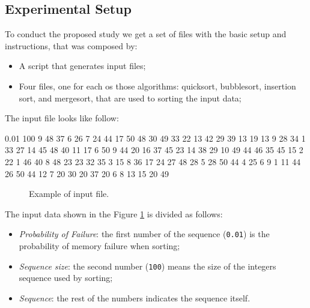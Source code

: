 

\subsection{Experimental Setup}

To conduct the proposed study we get a set of files with the basic setup and instructions, that was composed by:
\begin{itemize}
    \item A script that generates input files;
    \item Four files, one for each os those algorithms: quicksort, bubblesort, insertion sort, and mergesort, that are used to sorting the input data;
\end{itemize}

The input file looks like follow:

\begin{verbbox}[\mbox{}]
0.01 100 9 48 37 6 26 7 24 44 17 50 48 30 49 33 22 13 42 29 39 13 19 13 9 28 
34 1 33 27 14 45 48 40 11 17 6 50 9 44 20 16 37 45 23 14 38 29 10 49 44 46 35
45 15 2 22 1 46 40 8 48 23 23 32 35 3 15 8 36 17 24 27 48 28 5 28 50 44 4 25 
6 9 1 11 44 26 50 44 12 7 20 30 20 37 20 6 8 13 15 20 49
\end{verbbox}

\begin{figure}[H]
    \centering
    \fbox{
    \theverbbox
    }
    \caption{Example of input file.}
    \label{fig-input-file-example}
\end{figure}

The input data shown in the Figure \ref{fig-input-file-example} is divided as follows:

\begin{itemize}
    \item \textit{Probability of Failure}: the first number of the sequence (\texttt{0.01}) is the probability of memory failure when sorting;
    \item \textit{Sequence size}: the second number (\texttt{100}) means the size of the integers sequence used by sorting;
    \item \textit{Sequence}: the rest of the numbers indicates the sequence itself.
\end{itemize}

